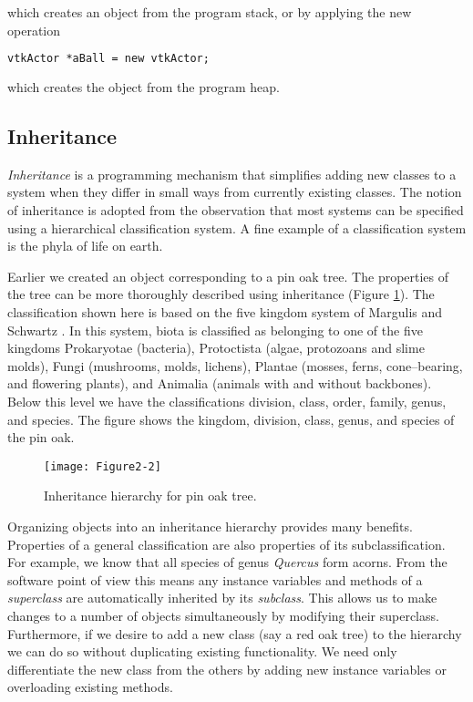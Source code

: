 \noindent which creates an object from the program stack, or by applying the new operation

\begin{lstlisting}[language=TCL,  caption={}, numbers=none, frame=none]
vtkActor *aBall = new vtkActor;
\end{lstlisting}

\noindent which creates the object from the program heap.

\subsection{Inheritance}

\emph{Inheritance} is a programming mechanism that simplifies adding new classes to a system when they differ in small ways from currently existing classes. The notion of inheritance is adopted from the observation that most systems can be specified using a hierarchical classification system. A fine example of a classification system is the phyla of life on earth.

Earlier we created an object corresponding to a pin oak tree. The properties of the tree can be more thoroughly described using inheritance (Figure \ref{fig:Figure2-2}). The classification shown here is based on the five kingdom system of Margulis and Schwartz \cite{Margulis88}.
In this system, biota is classified as belonging to one of the five kingdoms Prokaryotae (bacteria), Protoctista (algae, protozoans and slime molds), Fungi (mushrooms, molds, lichens), Plantae (mosses, ferns, cone--bearing, and flowering plants), and Animalia (animals with and without backbones). Below this level we have the classifications division, class, order, family, genus, and species. The figure shows the kingdom, division, class, genus, and species of the pin oak.

\begin{figure}[!htb]
	\centering
	\texttt{[image: Figure2-2]}
	\caption{Inheritance hierarchy for pin oak tree.}
	\label{fig:Figure2-2}
\end{figure}

Organizing objects into an inheritance hierarchy provides many benefits. Properties of a general classification are also properties of its subclassification. For example, we know that all species of genus \emph{Quercus} form acorns. From the software point of view this means any instance variables and methods of a \emph{superclass} are automatically inherited by its \emph{subclass}. This allows us to make changes to a number of objects simultaneously by modifying their superclass. Furthermore, if we desire to add a new class (say a red oak tree) to the hierarchy we can do so without duplicating existing functionality. We need only differentiate the new class from the others by adding new instance variables or overloading existing methods.


